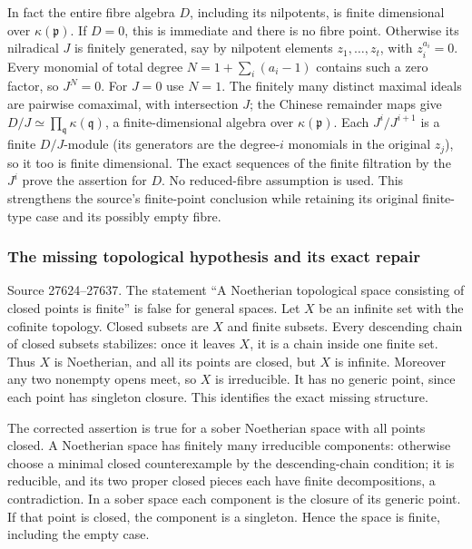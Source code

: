In fact the entire fibre algebra \(D\), including its nilpotents, is finite dimensional over \(\kappa(\mathfrak p)\). If \(D=0\), this is immediate and there is no fibre point. Otherwise its nilradical \(J\) is finitely generated, say by nilpotent elements \(z_1,\ldots,z_t\), with \(z_i^{a_i}=0\). Every monomial of total degree \(N=1+\sum_i(a_i-1)\) contains such a zero factor, so \(J^N=0\). For \(J=0\) use \(N=1\). The finitely many distinct maximal ideals are pairwise comaximal, with intersection \(J\); the Chinese remainder maps give \(D/J\simeq\prod_{\mathfrak q}\kappa(\mathfrak q)\), a finite-dimensional algebra over \(\kappa(\mathfrak p)\). Each \(J^i/J^{i+1}\) is a finite \(D/J\)-module (its generators are the degree-\(i\) monomials in the original \(z_j\)), so it too is finite dimensional. The exact sequences of the finite filtration by the \(J^i\) prove the assertion for \(D\). No reduced-fibre assumption is used. This strengthens the source's finite-point conclusion while retaining its original finite-type case and its possibly empty fibre.

\subsubsection{The missing topological hypothesis and its exact repair}\label{algebra-proof-024-the-missing-topological-hypothesis-and-its-exact-repair}

Source 27624--27637. The statement ``A Noetherian topological space consisting of closed points is finite'' is false for general spaces. Let \(X\) be an infinite set with the cofinite topology. Closed subsets are \(X\) and finite subsets. Every descending chain of closed subsets stabilizes: once it leaves \(X\), it is a chain inside one finite set. Thus \(X\) is Noetherian, and all its points are closed, but \(X\) is infinite. Moreover any two nonempty opens meet, so \(X\) is irreducible. It has no generic point, since each point has singleton closure. This identifies the exact missing structure.

The corrected assertion is true for a sober Noetherian space with all points closed. A Noetherian space has finitely many irreducible components: otherwise choose a minimal closed counterexample by the descending-chain condition; it is reducible, and its two proper closed pieces each have finite decompositions, a contradiction. In a sober space each component is the closure of its generic point. If that point is closed, the component is a singleton. Hence the space is finite, including the empty case.

